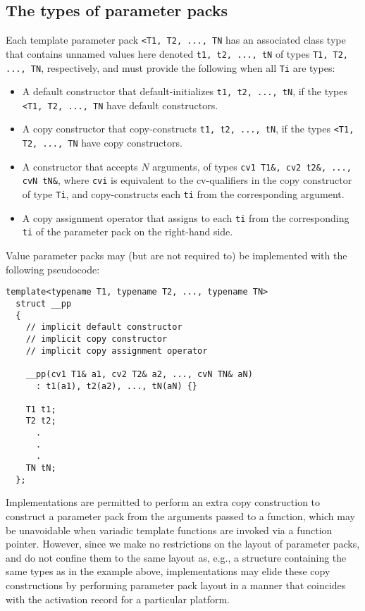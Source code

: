 \documentclass{article}
\begin{document}
\subsection{The types of parameter packs}
Each template parameter pack \texttt{<T1, T2, ..., TN} has an
associated class type that contains unnamed values here denoted
\texttt{t1, t2, ..., tN} of types \texttt{T1, T2, ..., TN},
respectively, and must provide the following when all \texttt{Ti} are
types:
\begin{itemize}
\item A default constructor that default-initializes \texttt{t1, t2,
    ..., tN}, if the types \texttt{<T1, T2, ..., TN} have default
  constructors.
\item A copy constructor that copy-constructs \texttt{t1, t2,
    ..., tN}, if the types \texttt{<T1, T2, ..., TN} have copy
  constructors.
\item A constructor that accepts $N$ arguments, of types \texttt{cv1
    T1\&, cv2 t2\&, ..., cvN tN\&}, where \texttt{cvi} is equivalent to
  the cv-qualifiers in the copy constructor of type \texttt{Ti}, and
  copy-constructs each \texttt{ti} from the corresponding argument.

\item A copy assignment operator that assigns to each \texttt{ti} from
  the corresponding \texttt{ti} of the parameter pack on the
  right-hand side.
\end{itemize}

Value parameter packs may (but are not required to) be implemented
with the following pseudocode:
\begin{verbatim}
template<typename T1, typename T2, ..., typename TN>
  struct __pp
  {
    // implicit default constructor
    // implicit copy constructor
    // implicit copy assignment operator
   
    __pp(cv1 T1& a1, cv2 T2& a2, ..., cvN TN& aN)
      : t1(a1), t2(a2), ..., tN(aN) {}

    T1 t1;
    T2 t2;
      .
      .
      .
    TN tN;
  };
\end{verbatim}

Implementations are permitted to perform an extra copy construction to
construct a parameter pack from the arguments passed to a function,
which may be unavoidable when variadic template functions are invoked
via a function pointer. However, since we make no restrictions on the
layout of parameter packs, and do not confine them to the same layout
as, e.g., a structure containing the same types as in the example
above, implementations may elide these copy constructions by
performing parameter pack layout in a manner that coincides with the
activation record for a particular platform.
\end{document}
